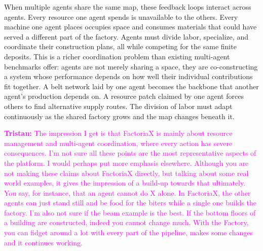 \documentclass{article}
\newcommand{\tristan}[1]{\textcolor{magenta}{\textbf{Tristan:} #1}}
\begin{document}
When multiple agents share the same map, these feedback loops interact across agents.
Every resource one agent spends is unavailable to the others. Every machine one agent places occupies space and consumes materials that could have served a different part of the factory.
Agents must divide labor, specialize, and coordinate their construction plans, all while competing for the same finite deposits.
This is a richer coordination problem than existing multi-agent benchmarks offer: agents are not merely sharing a space, they are co-constructing a system whose performance depends on how well their individual contributions fit together.
A belt network laid by one agent becomes the backbone that another agent's production depends on. A resource patch claimed by one agent forces others to find alternative supply routes.
The division of labor must adapt continuously as the shared factory grows and the map changes beneath it.

\tristan{The impression I get is that FactoriaX is mainly about resource management and multi-agent coordination, where every action has severe consequences. I'm not sure all these points are the most representative aspects of the platform. I would perhaps put more emphasis elsewhere. Although you are not making these claims about FactoriaX directly, but talking about some real world examples, it gives the impression of a build-up towards that ultimately. You say, for instance, that an agent cannot do X alone. In FactoriaX, the other agents can just stand still and be food for the biters while a single one builds the factory. I'm also not sure if the beam example is the best. If the bottom floors of a building are constructed, indeed you cannot change much. With the Factory, you can fidget around a lot with every part of the pipeline, makes some changes and it continues working.}

\end{document}
